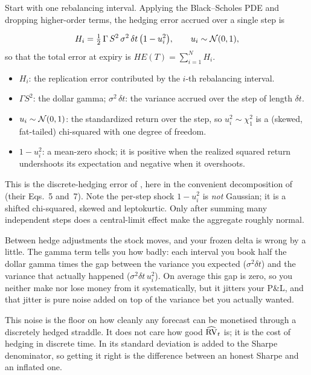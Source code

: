 Start with one rebalancing interval. Applying the Black--Scholes PDE and dropping higher-order terms, the hedging error accrued over a single step is

\begin{equation}
\label{eq:ivrv:boyle-emanuel}
H_i = \tfrac{1}{2}\,\Gamma\, S^2\, \sigma^2\, \delta t \,\big(1 - u_i^2\big), \qquad u_i \sim \mathcal{N}(0,1),
\end{equation}
so that the total error at expiry is $HE(T) = \sum_{i=1}^{N} H_i$.

\begin{itemize}
  \item $H_i$: the replication error contributed by the $i$-th rebalancing interval.
  \item $\Gamma S^2$: the dollar gamma; $\sigma^2\,\delta t$: the variance accrued over the step of length $\delta t$.
  \item $u_i \sim \mathcal{N}(0,1)$: the standardized return over the step, so $u_i^2 \sim \chi^2_1$ is a (skewed, fat-tailed) chi-squared with one degree of freedom.
  \item $1 - u_i^2$: a mean-zero shock; it is positive when the realized squared return undershoots its expectation and negative when it overshoots.
\end{itemize}

This is the discrete-hedging error of \citet{BoyleEmanuel1980}, here in the convenient decomposition of \citet{AnagnouHodges2007} (their Eqs.~5 and~7). Note the per-step shock $1-u_i^2$ is \emph{not} Gaussian; it is a shifted chi-squared, skewed and leptokurtic. Only after summing many independent steps does a central-limit effect make the aggregate roughly normal.

\begin{intuition}
Between hedge adjustments the stock moves, and your frozen delta is wrong by a little. The gamma term tells you how badly: each interval you book half the dollar gamma times the gap between the variance you expected ($\sigma^2\delta t$) and the variance that actually happened ($\sigma^2\delta t\,u_i^2$). On average this gap is zero, so you neither make nor lose money from it systematically, but it jitters your P\&L, and that jitter is pure noise added on top of the variance bet you actually wanted.
\end{intuition}

\begin{projectconnection}
This noise is the floor on how cleanly any forecast can be monetised through a discretely hedged straddle. It does not care how good $\widehat{\operatorname{RV}}_t$ is; it is the cost of hedging in discrete time. In  its standard deviation is added to the Sharpe denominator, so getting it right is the difference between an honest Sharpe and an inflated one.
\end{projectconnection}

